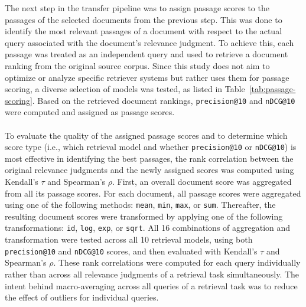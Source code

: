 The next step in the transfer pipeline was to assign passage scores to the passages of the selected documents from the previous step. This was done to identify the most relevant passages of a document with respect to the actual query associated with the document’s relevance judgment. To achieve this, each passage was treated as an independent query and used to retrieve a document ranking from the original source corpus. Since this study does not aim to optimize or analyze specific retriever systems but rather uses them for passage scoring, a diverse selection of models was tested, as listed in Table~\ref{tab:passage-scoring}. Based on the retrieved document rankings, \texttt{precision@10} and \texttt{nDCG@10} were computed and assigned as passage scores.
\\\\
To evaluate the quality of the assigned passage scores and to determine which score type (i.e., which retrieval model and whether \texttt{precision@10} or \texttt{nDCG@10}) is most effective in identifying the best passages, the rank correlation between the original relevance judgments and the newly assigned scores was computed using Kendall's $\tau$ and Spearman's $\rho$. First, an overall document score was aggregated from all its passage scores. For each document, all passage scores were aggregated using one of the following methods: \texttt{mean}, \texttt{min}, \texttt{max}, or \texttt{sum}. Thereafter, the resulting document scores were transformed by applying one of the following transformations: \texttt{id}, \texttt{log}, \texttt{exp}, or \texttt{sqrt}. All 16 combinations of aggregation and transformation were tested across all 10 retrieval models, using both \texttt{precision@10} and \texttt{nDCG@10} scores, and then evaluated with Kendall's $\tau$ and Spearman's $\rho$. These rank correlations were computed for each query individually rather than across all relevance judgments of a retrieval task simultaneously. The intent behind macro-averaging across all queries of a retrieval task was to reduce the effect of outliers for individual queries.
\\\\
